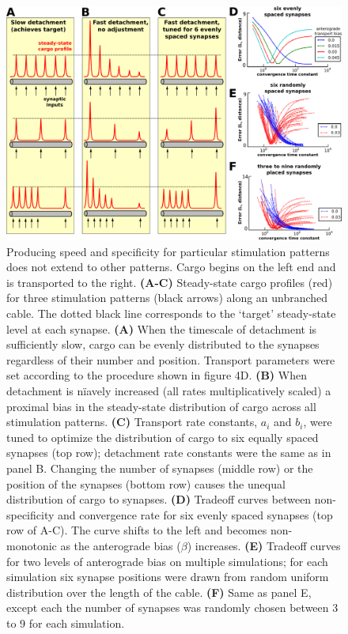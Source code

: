 \documentclass[11pt]{wlpeerj}
\begin{document}
\begin{figure}[!tb]
\begin{center}
\includegraphics[width=0.9\columnwidth]{06_heterosynaptic_cable.png}
\caption{Producing speed and specificity for particular stimulation patterns does not extend to other patterns. Cargo begins on the left end and is transported to the right.
\textbf{(A-C)} Steady-state cargo profiles (red) for three stimulation patterns (black arrows) along an unbranched cable. The dotted black line corresponds to the `target' steady-state level at each synapse.
\textbf{(A)} When the timescale of detachment is sufficiently slow, cargo can be evenly distributed to the synapses regardless of their number and position. Transport parameters were set according to the procedure shown in figure 4D.
\textbf{(B)} When detachment is n\"iavely increased (all rates multiplicatively scaled) a proximal bias in the steady-state distribution of cargo across all stimulation patterns.
\textbf{(C)} Transport rate constants, $a_i$ and $b_i$, were tuned to optimize the distribution of cargo to six equally spaced synapses (top row); detachment rate constants were the same as in panel B. Changing the number of synapses (middle row) or the position of the synapses (bottom row) causes the unequal distribution of cargo to synapses.
\textbf{(D)} Tradeoff curves between non-specificity and convergence rate for six evenly spaced synapses (top row of A-C). The curve shifts to the left and becomes non-monotonic as the anterograde bias ($\beta$) increases.
\textbf{(E)} Tradeoff curves for two levels of anterograde bias on multiple simulations; for each simulation six synapse positions were drawn from random uniform distribution over the length of the cable.
\textbf{(F)} Same as panel E, except each the number of synapses was randomly chosen between 3 to 9 for each simulation.
}
\end{center}
\end{figure}
\end{document}
